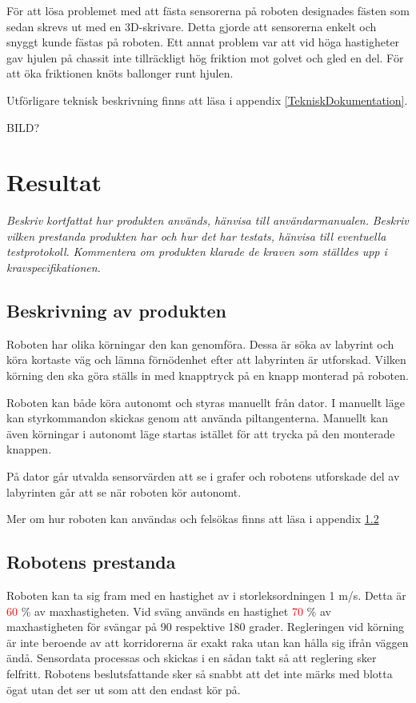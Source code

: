 \documentclass[11pt]{article}
\begin{document}
\begin{flushleft}
För att lösa problemet med att fästa sensorerna på roboten designades fästen som sedan skrevs ut med en 3D-skrivare. Detta gjorde att sensorerna enkelt och snyggt kunde fästas på roboten. Ett annat problem var att vid höga hastigheter gav hjulen på chassit inte tillräckligt hög friktion mot golvet och gled en del. För att öka friktionen knöts ballonger runt hjulen.

Utförligare teknisk beskrivning finns att läsa i appendix \ref{TekniskDokumentation}. 

BILD?

\pagebreak

\section{Resultat}
\textit{Beskriv kortfattat hur produkten används, hänvisa till användarmanualen.}
\textit{Beskriv vilken prestanda produkten har och hur det har testats, hänvisa till eventuella testprotokoll.}
\textit{Kommentera om produkten klarade de kraven som ställdes upp i kravspecifikationen. }

\subsection{Beskrivning av produkten}
Roboten har olika körningar den kan genomföra. Dessa är söka av labyrint och köra kortaste väg och lämna förnödenhet efter att labyrinten är utforskad. Vilken körning den ska göra ställs in med knapptryck på en knapp monterad på roboten. 

Roboten kan både köra autonomt och styras manuellt från dator. I manuellt läge kan styrkommandon skickas genom att använda piltangenterna. Manuellt kan även körningar i autonomt läge startas istället för att trycka på den monterade knappen. 

På dator går utvalda sensorvärden att se i grafer och robotens utforskade del av labyrinten går att se när roboten kör autonomt.

Mer om hur roboten kan användas och felsökas finns att läsa i appendix \ref{}

\subsection{Robotens prestanda}
Roboten kan ta sig fram med en hastighet av i storleksordningen 1 m/s. Detta är \textcolor{red}{60 }\% av maxhastigheten. Vid sväng används en hastighet \textcolor{red}{70 }\% av maxhastigheten för svängar på 90 respektive 180 grader. Regleringen vid körning är inte beroende av att korridorerna är exakt raka utan kan hålla sig ifrån väggen ändå. Sensordata processas och skickas i en sådan takt så att reglering sker felfritt. Robotens beslutsfattande sker så snabbt att det inte märks med blotta ögat utan det ser ut som att den endast kör på. 


\end{flushleft}
\end{document}
